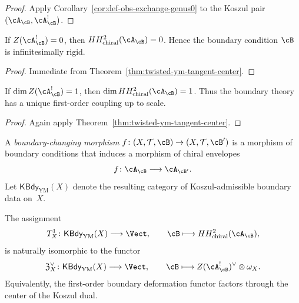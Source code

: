 \begin{proof}
Apply Corollary~\ref{cor:def-obs-exchange-genus0} to the Koszul pair
$(\cA_{\cB}, \cA_{\cB}^!)$.
\end{proof}

\begin{corollary}
\label{cor:twisted-ym-center-rigidity}
If $Z(\cA_{\cB}^!) = 0$, then $HH^2_{\mathrm{chiral}}(\cA_{\cB}) = 0$.
Hence the boundary condition $\cB$ is infinitesimally rigid.
\end{corollary}

\begin{proof}
Immediate from Theorem~\ref{thm:twisted-ym-tangent-center}.
\end{proof}

\begin{corollary}
\label{cor:twisted-ym-one-parameter}
If $\dim Z(\cA_{\cB}^!) = 1$, then $\dim HH^2_{\mathrm{chiral}}(\cA_{\cB}) = 1$.
Thus the boundary theory has a unique first-order coupling up to scale.
\end{corollary}

\begin{proof}
Again apply Theorem~\ref{thm:twisted-ym-tangent-center}.
\end{proof}

\begin{definition}
\label{def:twisted-ym-boundary-morphism}
A \emph{boundary-changing morphism}
$f \colon (X,\mathcal{T},\cB) \to (X,\mathcal{T},\cB')$
is a morphism of boundary conditions that induces a morphism of chiral envelopes
\[
f \colon \cA_{\cB} \longrightarrow \cA_{\cB'}.
\]
Let $\mathsf{KBdy}_{\mathrm{YM}}(X)$ denote the resulting category of Koszul-admissible
boundary data on~$X$.
\end{definition}

\begin{theorem}
\label{thm:twisted-ym-tangent-factors-through-center}
The assignment
\[
T^1_X \colon \mathsf{KBdy}_{\mathrm{YM}}(X) \longrightarrow \Vect,
\qquad
\cB \longmapsto HH^2_{\mathrm{chiral}}(\cA_{\cB}),
\]
is naturally isomorphic to the functor
\[
\mathfrak{Z}^{\vee}_{X} \colon \mathsf{KBdy}_{\mathrm{YM}}(X) \longrightarrow \Vect,
\qquad
\cB \longmapsto Z(\cA_{\cB}^!)^{\vee} \otimes \omega_X.
\]
Equivalently, the first-order boundary deformation functor factors through the center of
the Koszul dual.
\end{theorem}

